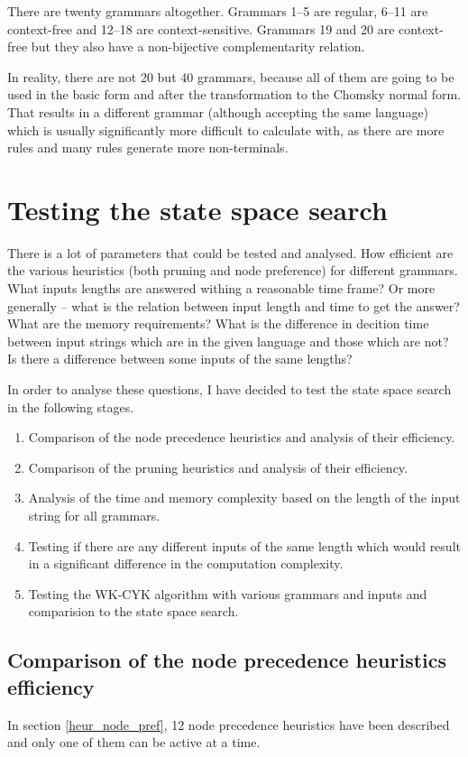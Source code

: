 There are twenty grammars altogether. Grammars 1--5 are regular, 6--11 are context-free and 12--18 are context-sensitive. Grammars 19 and 20 are context-free but they also have a non-bijective complementarity relation.

In reality, there are not 20 but 40 grammars, because all of them are going to be used in the basic form and after the transformation to the Chomsky normal form. That results in a different grammar (although accepting the same language) which is usually significantly more difficult to calculate with, as there are more rules and many rules generate more non-terminals.

\section{Testing the state space search}

There is a lot of parameters that could be tested and analysed. How efficient are the various heuristics (both pruning and node preference) for different grammars. What inputs lengths are answered withing a reasonable time frame? Or more generally -- what is the relation between input length and time to get the answer? What are the memory requirements? What is the difference in decition time between input strings which are in the given language and those which are not? Is there a difference between some inputs of the same lengths?

In order to analyse these questions, I have decided to test the state space search in the following stages.
\begin{enumerate}
  \item{Comparison of the node precedence heuristics and analysis of their efficiency.}
  \item{Comparison of the pruning heuristics and analysis of their efficiency.}
  \item{Analysis of the time and memory complexity based on the length of the input string for all grammars.}
  \item{Testing if there are any different inputs of the same length which would result in a significant difference in the computation complexity.}
  \item{Testing the WK-CYK algorithm with various grammars and inputs and comparision to the state space search.}
\end{enumerate}

\subsection{Comparison of the node precedence heuristics efficiency}
In section \ref{heur_node_pref}, 12 node precedence heuristics have been described and only one of them can be active at a time.

